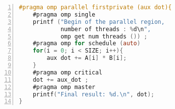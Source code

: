 \begin{lstlisting}[language=C, basicstyle=\footnotesize, numbers=left, 
                   frame=single, showspaces=false, showstringspaces=false,
                   caption={OpenMP Sample Program}, captionpos=b,
                   label=lst:listing-omp]
#pragma omp parallel firstprivate (aux dot){ 
    #pragma omp single
    printf ("Begin of the parallel region, 
            number of threads : %d\n", 
            omp get num threads ()) ;
    #pragma omp for schedule (auto) 
    for(i = 0; i < SIZE; i++){
        aux dot += A[i] * B[i]; 
    }    
    #pragma omp critical
    dot += aux_dot ;
    #pragma omp master
    printf("Final result: %d.\n", dot);
}
\end{lstlisting}
